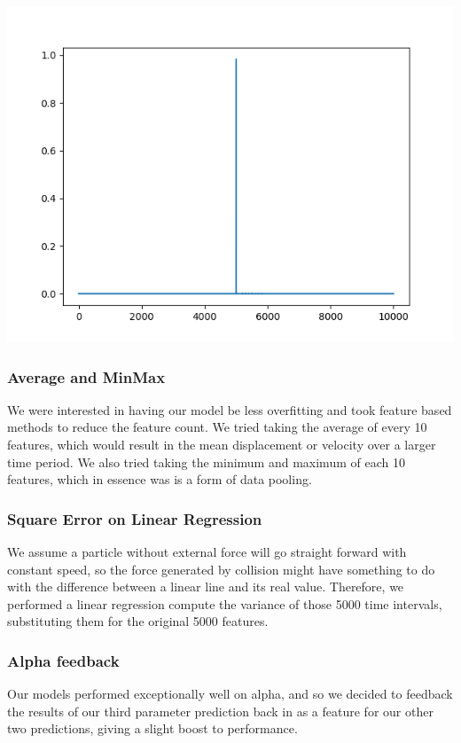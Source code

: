 \documentclass[a4paper, 12pt]{article}
\newenvironment{Figure}
  {\par\medskip\noindent\minipage{\linewidth}}
  {\endminipage\par\medskip}
\begin{document}
\begin{multicols}{2}
\begin{Figure}
                    \centering
                    \includegraphics[width=\linewidth]{images/importance_3.png}
                    \label{penfeat}
                \end{Figure}

                \subsubsection{Average and MinMax}
                    We were interested in having our model be less overfitting and took feature based methods to reduce the feature count. We tried taking the average of every 10 features, which would result in the mean displacement or velocity over a larger time period. We also tried taking the minimum and maximum of each 10 features, which in essence was is a form of data pooling.

                \subsubsection{Square Error on Linear Regression}
                    We assume a particle without external force will go straight forward with constant speed, so the force generated by collision might have something to do with the difference between a linear line and its real value. Therefore, we performed a linear regression compute the variance of those 5000 time intervals, substituting them for the original 5000 features.

                \subsubsection{Alpha feedback}
                    Our models performed exceptionally well on alpha, and so we decided to feedback the results of our third parameter prediction back in as a feature for our other two predictions, giving a slight boost to performance.


\end{multicols}
\end{document}
